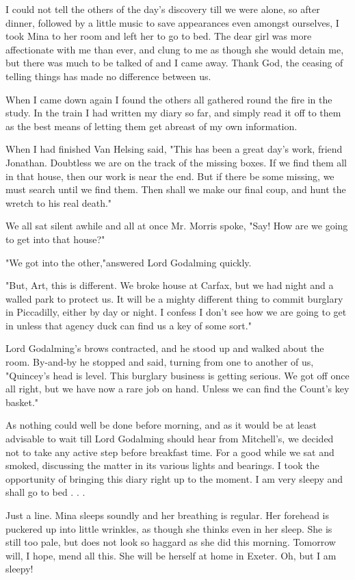 I could not tell the others of the day's discovery till we were alone, so after dinner, followed by a little music to save appearances even amongst ourselves, I took Mina to her room and left her to go to bed. The dear girl was more affectionate with me than ever, and clung to me as though she would detain me, but there was much to be talked of and I came away. Thank God, the ceasing of telling things has made no difference between us. 

When I came down again I found the others all gathered round the fire in the study. In the train I had written my diary so far, and simply read it off to them as the best means of letting them get abreast of my own information. 

When I had finished Van Helsing said, "This has been a great day's work, friend Jonathan. Doubtless we are on the track of the missing boxes. If we find them all in that house, then our work is near the end. But if there be some missing, we must search until we find them. Then shall we make our final coup, and hunt the wretch to his real death." 

We all sat silent awhile and all at once Mr. Morris spoke, "Say! How are we going to get into that house?" 

"We got into the other,"answered Lord Godalming quickly. 

"But, Art, this is different. We broke house at Carfax, but we had night and a walled park to protect us. It will be a mighty different thing to commit burglary in Piccadilly, either by day or night. I confess I don't see how we are going to get in unless that agency duck can find us a key of some sort." 

Lord Godalming's brows contracted, and he stood up and walked about the room. By-and-by he stopped and said, turning from one to another of us, "Quincey's head is level. This burglary business is getting serious. We got off once all right, but we have now a rare job on hand. Unless we can find the Count's key basket." 

As nothing could well be done before morning, and as it would be at least advisable to wait till Lord Godalming should hear from Mitchell's, we decided not to take any active step before breakfast time. For a good while we sat and smoked, discussing the matter in its various lights and bearings. I took the opportunity of bringing this diary right up to the moment. I am very sleepy and shall go to bed . . . 

Just a line. Mina sleeps soundly and her breathing is regular. Her forehead is puckered up into little wrinkles, as though she thinks even in her sleep. She is still too pale, but does not look so haggard as she did this morning. Tomorrow will, I hope, mend all this. She will be herself at home in Exeter. Oh, but I am sleepy! 

